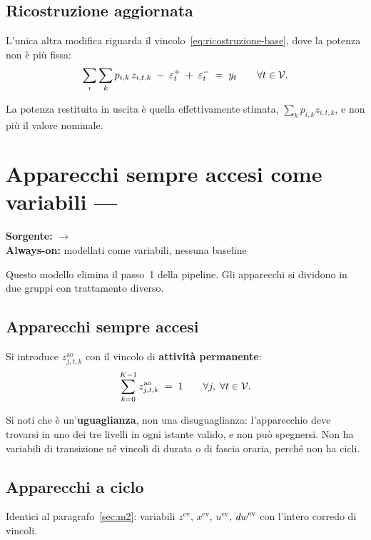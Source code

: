 \subsection*{Ricostruzione aggiornata}

L'unica altra modifica riguarda il vincolo~\eqref{eq:ricostruzione-base}, dove la potenza non è
più fissa:
\begin{equation}
  \sum_{i} \sum_{k} p_{i,k} \, z_{i,t,k} \;-\; \varepsilon^{+}_t \;+\; \varepsilon^{-}_t \;=\; y_t
  \qquad \forall t \in \mathcal{V} .
\end{equation}

La potenza restituita in uscita è quella effettivamente stimata,
$\sum_k p_{i,k} z_{i,t,k}$, e non più il valore nominale.

\section{Apparecchi sempre accesi come variabili --- }
\label{sec:m3}

\noindent\textbf{Sorgente:}  $\rightarrow$ \\
\textbf{Always-on:} modellati come variabili, nessuna baseline

Questo modello elimina il passo~1 della pipeline. Gli apparecchi si dividono in due gruppi con
trattamento diverso.

\subsection*{Apparecchi sempre accesi}

Si introduce $z^{\text{ao}}_{j,t,k}$ con il vincolo di \textbf{attività permanente}:
\begin{equation}
  \sum_{k=0}^{K-1} z^{\text{ao}}_{j,t,k} \;=\; 1
  \qquad \forall j,\; \forall t \in \mathcal{V} .
  \label{eq:always-on}
\end{equation}

Si noti che è un'\textbf{uguaglianza}, non una disuguaglianza: l'apparecchio deve trovarsi in uno
dei tre livelli in ogni istante valido, e non può spegnersi. Non ha variabili di transizione né
vincoli di durata o di fascia oraria, perché non ha cicli.

\subsection*{Apparecchi a ciclo}

Identici al paragrafo~\ref{sec:m2}: variabili $z^{\text{ev}}$, $x^{\text{ev}}$, $u^{\text{ev}}$,
$\mathit{dw}^{\text{ev}}$ con l'intero corredo di vincoli.

